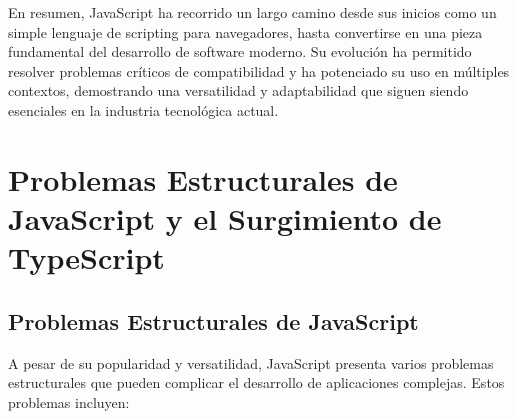 \documentclass{article}
\begin{document}
En resumen, JavaScript ha recorrido un largo camino desde sus inicios como un simple lenguaje de scripting para
navegadores, hasta convertirse en una pieza fundamental del desarrollo de software moderno. Su evolución ha permitido
resolver problemas críticos de compatibilidad y ha potenciado su uso en múltiples contextos, demostrando una
versatilidad y adaptabilidad que siguen siendo esenciales en la industria tecnológica actual.

\section*{Problemas Estructurales de JavaScript y el Surgimiento de TypeScript}

\subsection*{Problemas Estructurales de JavaScript}

A pesar de su popularidad y versatilidad, JavaScript presenta varios problemas estructurales que pueden complicar
el desarrollo de aplicaciones complejas. Estos problemas incluyen:
\end{document}
